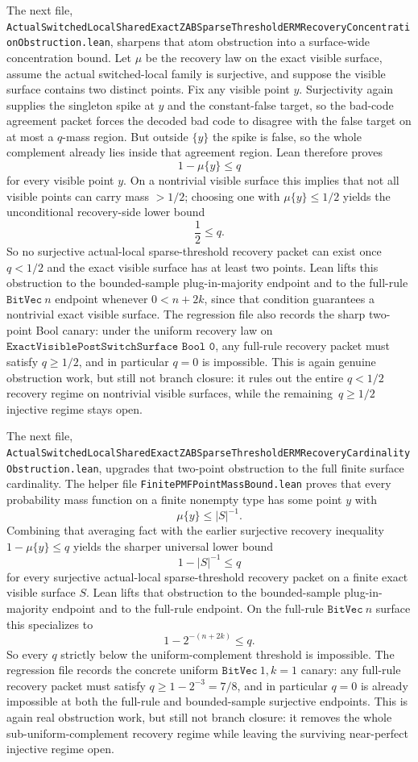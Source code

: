 \documentclass[11pt]{article}
\theoremstyle{remark}
\begin{document}
The next file,
\texttt{ActualSwitchedLocalSharedExactZABSparseThresholdERMRecoveryConcentrationObstruction.lean},
sharpens that atom obstruction into a surface-wide concentration bound.  Let
\(\mu\) be the recovery law on the exact visible surface, assume the actual
switched-local family is surjective, and suppose the visible surface contains
two distinct points.  Fix any visible point \(y\).  Surjectivity again supplies
the singleton spike at \(y\) and the constant-false target, so the bad-code
agreement packet forces the decoded bad code to disagree with the false target
on at most a \(q\)-mass region.  But outside \(\{y\}\) the spike is false, so
the whole complement already lies inside that agreement region.  Lean therefore
proves
\[
  1 - \mu\{y\} \le q
\]
for every visible point \(y\).  On a nontrivial visible surface this implies
that not all visible points can carry mass \(> 1/2\); choosing one with
\(\mu\{y\} \le 1/2\) yields the unconditional recovery-side lower bound
\[
  \frac12 \le q.
\]
So no surjective actual-local sparse-threshold recovery packet can exist once
\(q < 1/2\) and the exact visible surface has at least two points.  Lean lifts
this obstruction to the bounded-sample plug-in-majority endpoint and to the
full-rule \(\texttt{BitVec}\ n\) endpoint whenever \(0 < n + 2k\), since that
condition guarantees a nontrivial exact visible surface.  The regression file
also records the sharp two-point Bool canary: under the uniform recovery law on
\(\texttt{ExactVisiblePostSwitchSurface Bool 0}\), any full-rule recovery packet
must satisfy \(q \ge 1/2\), and in particular \(q = 0\) is impossible.  This is
again genuine obstruction work, but still not branch closure: it rules out the
entire \(q < 1/2\) recovery regime on nontrivial visible surfaces, while the
remaining \(\,q \ge 1/2\) injective regime stays open.

The next file,
\texttt{ActualSwitchedLocalSharedExactZABSparseThresholdERMRecoveryCardinalityObstruction.lean},
upgrades that two-point obstruction to the full finite surface cardinality.
The helper file \texttt{FinitePMFPointMassBound.lean} proves that every
probability mass function on a finite nonempty type has some point \(y\) with
\[
  \mu\{y\} \le |S|^{-1}.
\]
Combining that averaging fact with the earlier surjective recovery inequality
\(1 - \mu\{y\} \le q\) yields the sharper universal lower bound
\[
  1 - |S|^{-1} \le q
\]
for every surjective actual-local sparse-threshold recovery packet on a finite
exact visible surface \(S\).  Lean lifts that obstruction to the bounded-sample
plug-in-majority endpoint and to the full-rule endpoint.  On the full-rule
\(\texttt{BitVec}\ n\) surface this specializes to
\[
  1 - 2^{-(n+2k)} \le q.
\]
So every \(q\) strictly below the uniform-complement threshold is impossible.
The regression file records the concrete uniform \(\texttt{BitVec}\ 1, k=1\)
canary: any full-rule recovery packet must satisfy
\(q \ge 1 - 2^{-3} = 7/8\), and in particular \(q=0\) is already impossible at
both the full-rule and bounded-sample surjective endpoints.  This is again real
obstruction work, but still not branch closure: it removes the whole
sub-uniform-complement recovery regime while leaving the surviving near-perfect
injective regime open.
\end{document}

